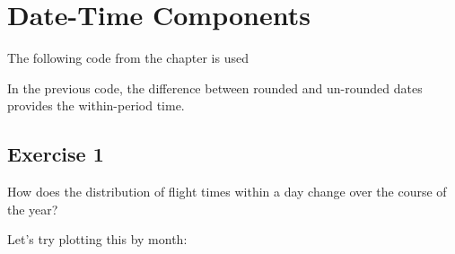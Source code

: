 \documentclass[]{book}
\newenvironment{Shaded}{\begin{snugshade}}{\end{snugshade}}
\newcommand{\DataTypeTok}[1]{\textcolor[rgb]{0.13,0.29,0.53}{#1}}
\newcommand{\DecValTok}[1]{\textcolor[rgb]{0.00,0.00,0.81}{#1}}
\newcommand{\KeywordTok}[1]{\textcolor[rgb]{0.13,0.29,0.53}{\textbf{#1}}}
\newcommand{\NormalTok}[1]{#1}
\newcommand{\OperatorTok}[1]{\textcolor[rgb]{0.81,0.36,0.00}{\textbf{#1}}}
\newcommand{\OtherTok}[1]{\textcolor[rgb]{0.56,0.35,0.01}{#1}}
\newcommand{\StringTok}[1]{\textcolor[rgb]{0.31,0.60,0.02}{#1}}
\theoremstyle{plain}
\theoremstyle{remark}
\theoremstyle{definition}
\theoremstyle{definition}
\theoremstyle{definition}
\theoremstyle{remark}
\begin{document}
\hypertarget{date-time-components}{%
\section{Date-Time Components}\label{date-time-components}}

The following code from the chapter is used

\begin{Shaded}
\end{Shaded}

In the previous code, the difference between rounded and un-rounded
dates provides the within-period time.

\hypertarget{exercise-1-47}{%
\subsection{Exercise 1}\label{exercise-1-47}}

How does the distribution of flight times within a day change over the
course of the year?

Let's try plotting this by month:

\begin{Shaded}
\end{Shaded}
\end{document}
